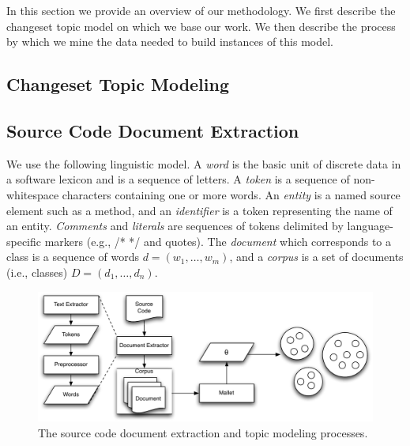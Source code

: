 
In this section we provide an overview of our methodology.
We first describe the changeset topic model on which we base our work.
We then describe the process by which we mine the data
needed to build instances of this model.

\subsection{Changeset Topic Modeling}
\label{sec:changesets}

\subsection{Source Code Document Extraction}
\label{sec:extract}

We use the following linguistic model.
A \textit{word}
is the basic unit of discrete data in a software lexicon and
is a sequence of letters.
A \textit{token} is a sequence of non-whitespace characters
containing one or more words.
An {\it entity} is a named source element such as a method,
and an \textit{identifier} is a token representing the name of an entity.
\textit{Comments} and \textit{literals} are sequences of tokens
delimited by language-specific markers (e.g., /* */ and quotes).
The \textit{document} which corresponds to a class is a sequence of words $d = (w_1, \ldots, w_m)$,
and a \textit{corpus} is a set of documents (i.e., classes) $D = (d_1, \ldots, d_n)$.


\begin{figure}
\vspace{2mm}
\centerline{\includegraphics[width=.8625\textwidth]{Clustering}}
\caption{The source code document extraction and topic modeling processes.}
\label{fig:extract}
\vspace{-2mm}
\end{figure}

